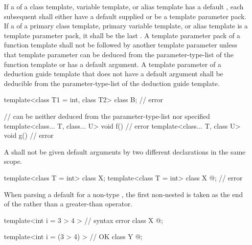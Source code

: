 \pnum
If a
of a class template, variable template, or alias template has a default
,
each subsequent
shall either have a default
supplied
or be a template parameter pack. If a 
of a primary class template, primary variable template, or alias template
is a template parameter pack, it shall be the last
.
A template parameter pack of a function template shall not be followed by
another
template parameter unless that template parameter can be deduced from the
parameter-type-list of the function template or has a
default argument.
A template parameter of a deduction guide template
that does not have a default argument
shall be deducible
from the parameter-type-list
of the deduction guide template.
\begin{example}
\begin{codeblock}
template<class T1 = int, class T2> class B;     // error

//  can be neither deduced from the parameter-type-list nor specified
template<class... T, class... U> void f() { }   // error
template<class... T, class U> void g() { }      // error
\end{codeblock}
\end{example}

\pnum
A
shall
not be given default arguments by two different declarations in the same scope.
\begin{example}
\begin{codeblock}
template<class T = int> class X;
template<class T = int> class X { @\commentellip@ };  // error
\end{codeblock}
\end{example}

%
\pnum
When parsing a
default
for a non-type
,
the first non-nested
\tcode{>}
is taken as the end of the
rather than a greater-than operator.
\begin{example}
\begin{codeblock}
template<int i = 3 > 4 >        // syntax error
class X { @\commentellip@ };

template<int i = (3 > 4) >      // OK
class Y { @\commentellip@ };
\end{codeblock}
\end{example}

